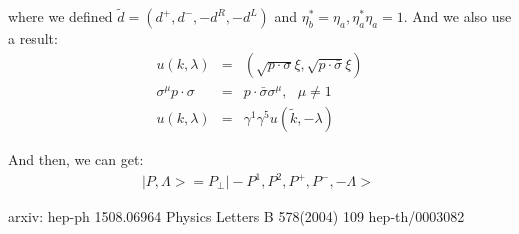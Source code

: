 \documentclass[a4paper,12pt]{article}
\begin{document}
where we defined $\tilde{d}=(d^+,d^-,-d^R,-d^L)$ and $\eta^{\ast}_b=\eta_a,\eta^{\ast}_a\eta_a = 1$. And we also use a result:
\begin{eqnarray}
u(k,\lambda) &=& (\sqrt{p\cdot \sigma} \xi , \sqrt{p\cdot \bar{\sigma}} \xi)\nonumber\\
\sigma^{\mu} p\cdot \sigma &=& p\cdot \bar{\sigma} \sigma^{\mu},\ \ \ \mu \neq 1\nonumber\\
u(k,\lambda) &=& \gamma^1\gamma^5 u(\tilde{k},-\lambda)\
\end{eqnarray}

And then, we can get:
\begin{eqnarray}
|P,\Lambda>= P_{\perp} |-P^1,P^2,P^+,P^-,-\Lambda>\
\end{eqnarray}




























\begin{thebibliography}{90}
%
 arxiv: hep-ph 1508.06964
 Physics Letters B 578(2004) 109
\bibitem{prd3} hep-th/0003082





\end{thebibliography}
\end{document}
